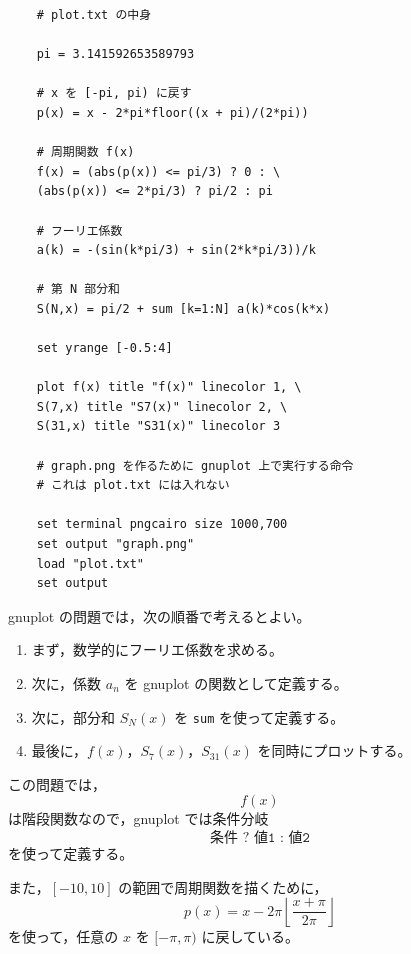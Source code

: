 \begin{lstlisting}
	# plot.txt の中身
	
	pi = 3.141592653589793
	
	# x を [-pi, pi) に戻す
	p(x) = x - 2*pi*floor((x + pi)/(2*pi))
	
	# 周期関数 f(x)
	f(x) = (abs(p(x)) <= pi/3) ? 0 : \
	(abs(p(x)) <= 2*pi/3) ? pi/2 : pi
	
	# フーリエ係数
	a(k) = -(sin(k*pi/3) + sin(2*k*pi/3))/k
	
	# 第 N 部分和
	S(N,x) = pi/2 + sum [k=1:N] a(k)*cos(k*x)
	
	set yrange [-0.5:4]
	
	plot f(x) title "f(x)" linecolor 1, \
	S(7,x) title "S7(x)" linecolor 2, \
	S(31,x) title "S31(x)" linecolor 3
	
	# graph.png を作るために gnuplot 上で実行する命令
	# これは plot.txt には入れない
	
	set terminal pngcairo size 1000,700
	set output "graph.png"
	load "plot.txt"
	set output
\end{lstlisting}
\begin{strategy}
	gnuplot の問題では，次の順番で考えるとよい。
	
	\begin{enumerate}
		\item まず，数学的にフーリエ係数を求める。
		\item 次に，係数 \(a_n\) を gnuplot の関数として定義する。
		\item 次に，部分和 \(S_N(x)\) を \texttt{sum} を使って定義する。
		\item 最後に，\(f(x)\)，\(S_7(x)\)，\(S_{31}(x)\) を同時にプロットする。
	\end{enumerate}
	
	この問題では，
	\[
	f(x)
	\]
	は階段関数なので，gnuplot では条件分岐
	\[
	\texttt{条件 ? 値1 : 値2}
	\]
	を使って定義する。
	
	また，\([-10,10]\) の範囲で周期関数を描くために，
	\[
	p(x)=x-2\pi\left\lfloor\frac{x+\pi}{2\pi}\right\rfloor
	\]
	を使って，任意の \(x\) を \([-\pi,\pi)\) に戻している。
\end{strategy}
